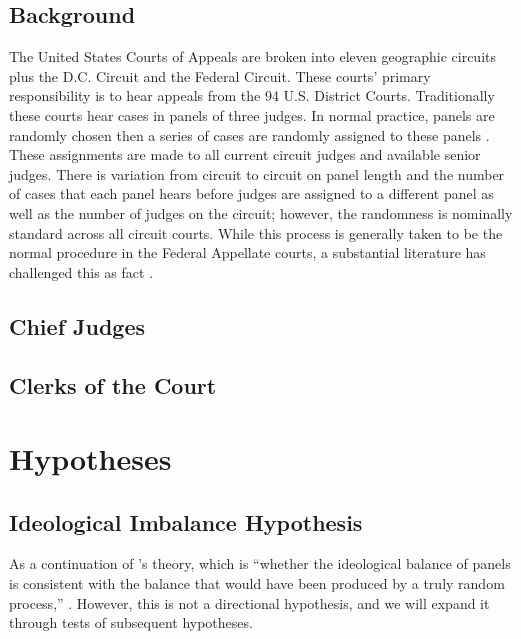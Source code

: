 \documentclass[12pt]{article}
\begin{document}
\subsection*{Background}
The United States Courts of Appeals are broken into eleven geographic circuits plus the D.C. Circuit and the Federal Circuit. These courts' primary responsibility is to hear appeals from the 94 U.S. District Courts. Traditionally these courts hear cases in panels of three judges. In normal practice, panels are randomly chosen then a series of cases are randomly assigned to these panels \citep{Hooper2011,Journalist2011,Chilton2014,Songer2007}.  These assignments are made to all current circuit judges and available senior judges. There is variation from circuit to circuit on panel length and the number of cases that each panel hears before judges are assigned to a different panel as well as the number of judges on the circuit; however, the randomness is nominally standard across all circuit courts.  While this process is generally taken to be the normal procedure in the Federal Appellate courts, a substantial literature has challenged this as fact \citep{Atkins1974,Brown2000,Chilton2014}.  

\subsection*{Chief Judges}

\subsection*{Clerks of the Court}

\section{Hypotheses}\label{Hypotheses}
\subsection*{Ideological Imbalance Hypothesis}
As a continuation of \citeauthor{Chilton2014}'s theory, which is ``whether the ideological balance of panels is consistent with the balance that would have been produced by a truly random process,'' \citep[20]{Chilton2014}.  However, this is not a directional hypothesis, and we will expand it through tests of subsequent hypotheses.
\end{document}
